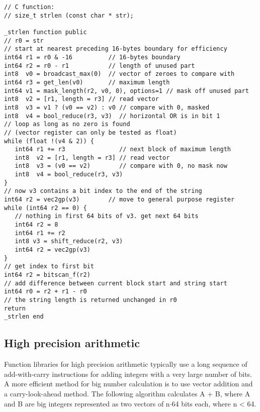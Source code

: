 \documentclass[forwardcom.tex]{subfiles}
\begin{document}
\begin{example}
\label{exampleStrlen}
\end{example}
\begin{lstlisting}[frame=single]
// C function:
// size_t strlen (const char * str);

_strlen function public
// r0 = str
// start at nearest preceding 16-bytes boundary for efficiency
int64 r1 = r0 & -16          // 16-bytes boundary
int64 r2 = r0 - r1           // length of unused part
int8  v0 = broadcast_max(0)  // vector of zeroes to compare with
int64 r3 = get_len(v0)       // maximum length
int64 v1 = mask_length(r2, v0, 0), options=1 // mask off unused part
int8  v2 = [r1, length = r3] // read vector
int8  v3 = v1 ? (v0 == v2) : v0 // compare with 0, masked
int8  v4 = bool_reduce(r3, v3)  // horizontal OR is in bit 1
// loop as long as no zero is found
// (vector register can only be tested as float)
while (float !(v4 & 2)) {
   int64 r1 += r3               // next block of maximum length
   int8  v2 = [r1, length = r3] // read vector
   int8  v3 = (v0 == v2)        // compare with 0, no mask now
   int8  v4 = bool_reduce(r3, v3)
}
// now v3 contains a bit index to the end of the string
int64 r2 = vec2gp(v3)        // move to general purpose register
while (int64 r2 == 0) {
   // nothing in first 64 bits of v3. get next 64 bits
   int64 r2 = 8
   int64 r1 += r2
   int8 v3 = shift_reduce(r2, v3)
   int64 r2 = vec2gp(v3)
}
// get index to first bit
int64 r2 = bitscan_f(r2)
// add difference between current block start and string start
int64 r0 = r2 + r1 - r0
// the string length is returned unchanged in r0
return
_strlen end   
\end{lstlisting}
\vspace{4mm}


\subsection{High precision arithmetic} \label{highPrecisionArithmetic}
Function libraries for high precision arithmetic typically use a long sequence of add-with-carry instructions for adding integers with a very large number of bits. A more efficient method for big number calculation is to use vector addition and a carry-look-ahead method. The following algorithm calculates A + B, where A and B are big integers represented as two vectors of n$\cdot$64 bits each, where n \textless{} 64.
\vspace{2mm}
\end{document}
